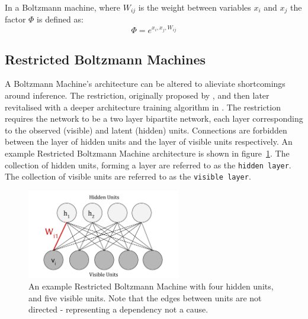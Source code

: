 In a Boltzmann machine, where $W_{ij}$ is the weight between variables $x_i$ and $x_j$ the factor $\Phi$ is defined as:
$$
\Phi = e^{x_i,x_j,W_{ij}}
$$

\subsection{Restricted Boltzmann Machines}


A Boltzmann Machine's architecture can be altered to alieviate shortcomings around inference. The restriction, originally proposed by \cite{Smolensky:1986vy}, and then later revitalised with a deeper architecture training algorithm in \cite{geoffreye.hintonterrencej.sejnowski1983}. The restriction requires the network to be a two layer bipartite network, each layer corresponding to the observed (visible) and latent (hidden) units. Connections are forbidden between the layer of hidden units and the layer of visible units respectively. An example Restricted Boltzmann Machine architecture is shown in figure~\ref{F:Restricted-Boltzmann-Machine}. The collection of hidden units, forming a layer are referred to as the \texttt{hidden layer}. The collection of visible units are referred to as the \texttt{visible layer}.

\begin{figure}[h]
\begin{center}
  \includegraphics[width = 0.6\textwidth]{Assets/RBM_Example.png}
\caption{An example Restricted Boltzmann Machine with four hidden units, and five visible units. Note that the edges between units are not directed - representing a dependency not a cause. }
\label{F:Restricted-Boltzmann-Machine}
\end{center}
\end{figure}



